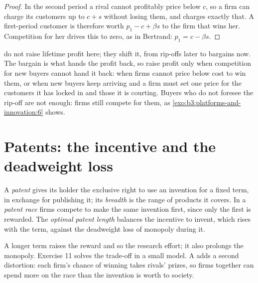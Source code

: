 \begin{proof}
In the second period a rival cannot profitably price below $c$, so a firm can charge its
customers up to $c + s$ without losing them, and charges exactly that. A first-period customer is
therefore worth $p_1 - c + \beta s$ to the firm that wins her. Competition for her drives this to zero, as in
Bertrand: $p_1 = c - \beta s$.
\end{proof}

 do not raise lifetime profit here; they shift it, from rip-offs
later to bargains now. The bargain is what hands the profit back, so 
raise profit only when competition for new buyers cannot hand it back: when firms
cannot price below cost to win them, or when new buyers keep arriving and a firm must
set one price for the customers it has locked in and those it is courting. Buyers who
do not foresee the rip-off are not enough: firms still compete for them, as
\cref{exo:b3:platforms-and-innovation:6} shows.

\section{Patents: the incentive and the deadweight loss}\label{sec:b3:platforms-and-innovation:patents}

\begin{definition}\label{def:b3:platforms-and-innovation:patent}
A \emph{patent} gives its holder the exclusive right to use an invention for a fixed
term, in exchange for publishing it; its \emph{breadth} is the range of products it
covers. In a \emph{patent race} firms compete to make the same invention first,
since only the first is rewarded. The \emph{optimal patent length} balances the
incentive to invent, which rises with the term, against the deadweight loss of
monopoly during it.
\end{definition}

A longer term raises the reward and so the research effort; it also prolongs the
monopoly. Exercise 11 solves the trade-off in a small model. A  adds a
second distortion: each firm's chance of winning takes rivals' prizes, so firms
together can spend more on the race than the invention is worth to society.

